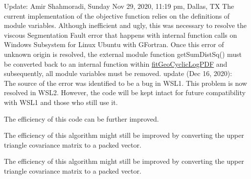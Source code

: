 
\begin{DoxyRefList}
\item[Subprogram \mbox{\hyperlink{namespacegeocyclicfit__mod_a88d66e1fac5af41881bea1fd31e21fb6}{geocyclicfit\+\_\+mod\+::fitgeocycliclogpdf}} (max\+Num\+Trial, num\+Trial, Success\+Step, Log\+Count)]\label{todo__todo000001}%
%
 Update\+: Amir Shahmoradi, Sunday Nov 29, 2020, 11\+:19 pm, Dallas, TX The current implementation of the objective function relies on the definitions of module variables. Although inefficient and ugly, this was necessary to resolve the viscous Segmentation Fault error that happens with internal function calls on Windows Subsystem for Linux Ubuntu with G\+Fortran. Once this error of unknown origin is resolved, the external module function {\ttfamily get\+Sum\+Dist\+Sq()} must be converted back to an internal function within \mbox{\hyperlink{namespacegeocyclicfit__mod_a88d66e1fac5af41881bea1fd31e21fb6}{fit\+Geo\+Cyclic\+Log\+P\+DF}} and subsequently, all module variables must be removed. update (Dec 16, 2020)\+: ~\newline
 The source of the error was identified to be a bug in W\+S\+L1. This problem is now resolved in W\+S\+L2. However, the code will be kept intact for future compatibility with W\+S\+L1 and those who still use it. 
\item[Subprogram \mbox{\hyperlink{namespacestatistics__mod_ae0ef3a61c55dfcfe454859ecb2c37735}{statistics\+\_\+mod\+::getsamcholfac}} (nd, np, Mean, Point, Cholesky\+Lower, Diagonal)]\label{todo__todo000004}%
%
 The efficiency of this code can be further improved.  
\item[Subprogram \mbox{\hyperlink{namespacestatistics__mod_ae3a68b874274f39e5e4b86c73797ee9b}{statistics\+\_\+mod\+::mergemeancovupper}} (nd, npA, Mean\+VecA, Cov\+Mat\+UpperA, npB, Mean\+VecB, Cov\+Mat\+UpperB, Mean\+Vec\+AB, Cov\+Mat\+Upper\+AB)]\label{todo__todo000005}%
%
 The efficiency of this algorithm might still be improved by converting the upper triangle covariance matrix to a packed vector. 
\item[Subprogram \mbox{\hyperlink{namespacestatistics__mod_a523d288d53f9a12bce86fdb78014e363}{statistics\+\_\+mod\+::mergemeancovupperdense}} (nd, npA, Mean\+VecA, Cov\+Mat\+UpperA, npB, Mean\+VecB, Cov\+Mat\+UpperB)]\label{todo__todo000006}%
%
 The efficiency of this algorithm might still be improved by converting the upper triangle covariance matrix to a packed vector. 
\item[Subprogram \mbox{\hyperlink{namespacestatistics__mod_a00b98933f2edfb603faac8f0acd2814a}{statistics\+\_\+mod\+::getrandpointonellipsoid}} (nd, Mean\+Vec, Cholesky\+Lower, Diagonal)]\label{todo__todo000007}%

\end{DoxyRefList}
